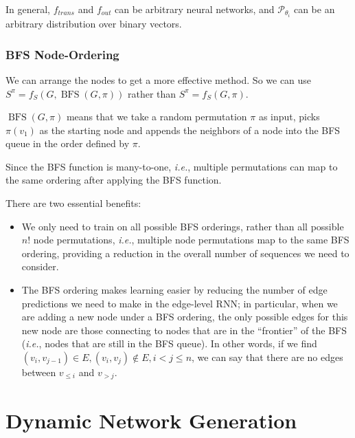 \begin{survey}
\vspace{0.2cm}

In general, \(f_{trans}\) and \(f_{out}\) can be arbitrary neural
networks, and \(\mathcal{P}_{\theta_{i}}\) can be an arbitrary
distribution over binary vectors.

\subsubsection{BFS Node-Ordering}

We can arrange the nodes to get a more effective method. So we can use
\(S^{\pi}=f_{S}(G, \operatorname{BFS}(G, \pi))\) rather than
\(S^{\pi}=f_{S}(G, \pi)\).

\(\operatorname{BFS}(G, \pi)\) means that we take a random permutation
\(\pi\) as input, picks \(π(v_1)\) as the starting node and appends the
neighbors of a node into the BFS queue in the order defined by \(\pi\).

Since the BFS function is many-to-one, \emph{i.e.}, multiple
permutations can map to the same ordering after applying the BFS
function.

There are two essential benefits:

\begin{itemize}
\item
  We only need to train on all possible BFS orderings, rather than all
  possible \(n!\) node permutations, \emph{i.e.}, multiple node
  permutations map to the same BFS ordering, providing a reduction in
  the overall number of sequences we need to consider.
\item
  The BFS ordering makes learning easier by reducing the number of edge
  predictions we need to make in the edge-level RNN; in particular, when
  we are adding a new node under a BFS ordering, the only possible edges
  for this new node are those connecting to nodes that are in the
  “frontier” of the BFS (\emph{i.e.}, nodes that are still in the BFS
  queue). In other words, if we find
  \((v_i, v_{j-1})\in E, (v_i, v_{j})\notin E, i < j \le n\), we can say
  that there are no edges between \(v_{\le i}\) and \(v_{>j}\).
\end{itemize}

\vspace{0.2cm}

\section{Dynamic Network Generation}


\end{survey}
